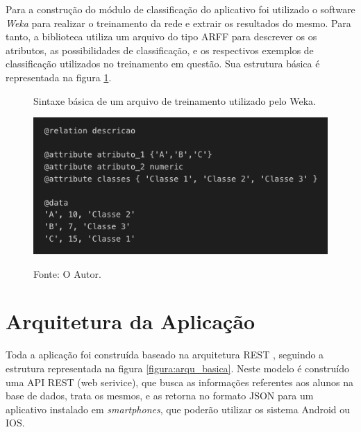 Para a construção do módulo de classificação do aplicativo foi utilizado o software \textit{Weka} para realizar o treinamento da rede e extrair os resultados do mesmo. Para tanto, a biblioteca utiliza um arquivo do tipo ARFF para descrever os os atributos, as possibilidades de classificação, e os respectivos exemplos de classificação utilizados no treinamento em questão. Sua estrutura básica é representada na figura \ref{figura:arff}.

\begin{figure}[H]
	\caption{Sintaxe básica de um arquivo de treinamento utilizado pelo Weka.}
	\centering %
	\includegraphics[width=12cm]{resources/arff.png} %
	\label{figura:arff}
	\captionsetup{singlelinecheck = false, format= hang, justification=raggedright, labelsep=space, width=12cm}
	\caption*{\footnotesize Fonte: O Autor.}
\end{figure}

\section{Arquitetura da Aplicação}

Toda a aplicação foi construída baseado na arquitetura REST \cite{fielding2000}, seguindo a estrutura representada na figura \ref{figura:arqu_basica}. Neste modelo é construído uma API REST (web serivice), que busca as informações referentes aos alunos na base de dados, trata os mesmos, e as retorna no formato JSON para um aplicativo instalado em \textit{smartphones}, que poderão utilizar os sistema Android ou IOS.

